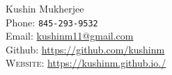 \documentclass[11pt, letterpaper]{article} %
\newcommand{\years}[1]{\marginnote{\scriptsize #1}} %
\begin{document}

{\LARGE Kushin Mukherjee}\\[1cm] %
Phone: \texttt{845-293-9532}\\ %
Email: \href{mailto:kushinm11@gmail.com}{kushinm11@gmail.com}\\ %
Github: \href{https://github.com/kushinm}{https://github.com/kushinm}\\
\textsc{Website}: \href{https://kushinm.github.io./}{https://kushinm.github.io./}\\ %











\end{document}
